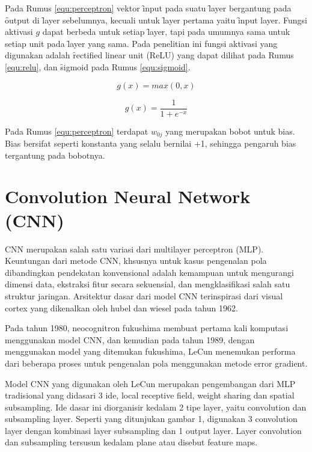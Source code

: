 Pada Rumus \ref{equ:perceptron} vektor \f{input} pada suatu \f{layer} bergantung pada \f{output} di \f{layer} sebelumnya, kecuali untuk \f{layer} pertama yaitu \f{input layer}. Fungsi aktivasi $g$ dapat berbeda untuk setiap \f{layer}, tapi pada umumnya sama untuk setiap unit pada \f{layer} yang sama. Pada penelitian ini fungsi aktivasi yang digunakan adalah \f{rectified linear unit} (ReLU) yang dapat dilihat pada Rumus \ref{equ:relu}, dan \f{sigmoid} pada Rumus \ref{equ:sigmoid}.

\begin{equation}
\label{equ:relu}
g(x) = max(0, x)
\end{equation}

\begin{equation}
\label{equ:sigmoid}
g(x) = \frac{1}{1 + e^{-x}}
\end{equation}

Pada Rumus \ref{equ:perceptron} terdapat $w_{0j}$ yang merupakan bobot untuk bias. Bias bersifat seperti konstanta yang selalu bernilai +1, sehingga pengaruh bias tergantung pada bobotnya.

\section{Convolution Neural Network (CNN)}
CNN merupakan salah satu variasi dari multilayer perceptron (MLP). Keuntungan dari metode CNN, khsusnya untuk kasus pengenalan pola dibandingkan pendekatan konvensional adalah kemampuan untuk mengurangi dimensi data, ekstraksi fitur secara sekuensial, dan mengklasifikasi salah satu struktur jaringan. Arsitektur dasar dari model CNN terinspirasi dari visual cortex yang dikenalkan oleh hubel dan wiesel pada tahun 1962.

Pada tahun 1980, neocognitron fukushima membuat pertama kali komputasi menggunakan model CNN, dan kemudian pada tahun 1989, dengan menggunakan model yang ditemukan fukushima, LeCun menemukan performa dari beberapa proses untuk pengenalan pola menggunakan metode error gradient.

Model CNN yang digunakan oleh LeCun merupakan pengembangan dari MLP tradisional yang didasari 3 ide, local receptive field, weight sharing dan spatial subsampling. Ide dasar ini diorganisir kedalam 2 tipe layer, yaitu convolution dan subsampling layer. Seperti yang ditunjukan gambar 1, digunakan 3 convolution layer dengan kombinasi layer subsampling dan 1 output layer. Layer convolution dan subsampling tersusun kedalam plane atau disebut feature maps.

